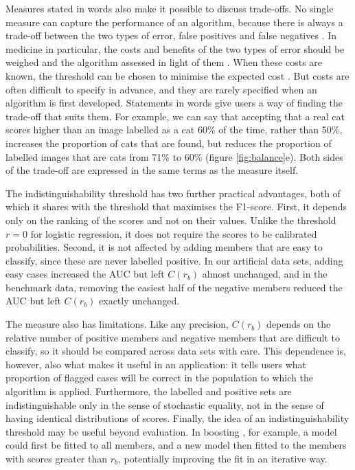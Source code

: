 \documentclass[preprint,12pt]{article}
\begin{document}
Measures stated in words also make it possible to discuss trade-offs. No single measure can capture the performance of an algorithm, because there is always a trade-off between the two types of error, false positives and false negatives \cite{neyman1933ix, scott2007performance}. In medicine in particular, the costs and benefits of the two types of error should be weighed and the algorithm assessed in light of them \cite{obuchowski2018receiver, chu1999introduction, care2018new}. When these costs are known, the threshold can be chosen to minimise the expected cost \cite{elkan2001foundations}. But costs are often difficult to specify in advance, and they are rarely specified when an algorithm is first developed. Statements in words give users a way of finding the trade-off that suits them. For example, we can say that accepting that a real cat scores higher than an image labelled as a cat 60\% of the time, rather than 50\%, increases the proportion of cats that are found, but reduces the proportion of labelled images that are cats from 71\% to 60\% (figure \ref{fig:balance}e). Both sides of the trade-off are expressed in the same terms as the measure itself.

The indistinguishability threshold has two further practical advantages, both of which it shares with the threshold that maximises the F1-score. First, it depends only on the ranking of the scores and not on their values. Unlike the threshold $r=0$ for logistic regression, it does not require the scores to be calibrated probabilities. Second, it is not affected by adding members that are easy to classify, since these are never labelled positive. In our artificial data sets, adding easy cases increased the AUC but left $C(r_b)$ almost unchanged, and in the benchmark data, removing the easiest half of the negative members reduced the AUC but left $C(r_b)$ exactly unchanged.

The measure also has limitations. Like any precision, $C(r_b)$ depends on the relative number of positive members and negative members that are difficult to classify, so it should be compared across data sets with care. This dependence is, however, also what makes it useful in an application: it tells users what proportion of flagged cases will be correct in the population to which the algorithm is applied. Furthermore, the labelled and positive sets are indistinguishable only in the sense of stochastic equality, not in the sense of having identical distributions of scores. Finally, the idea of an indistinguishability threshold may be useful beyond evaluation. In boosting \cite{schapire2003boosting}, for example, a model could first be fitted to all members, and a new model then fitted to the members with scores greater than $r_b$, potentially improving the fit in an iterative way.
\end{document}
